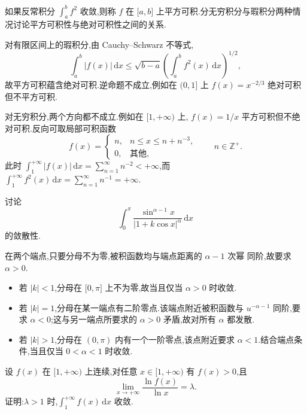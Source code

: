 \begin{example}
  如果反常积分 $\displaystyle\int_a^bf^2$ 收敛,则称 $f$ 在 $\lbrack a,b\rbrack$ 上平方可积.分无穷积分与瑕积分两种情况讨论平方可积性与绝对可积性之间的关系.
\end{example}
\exampleblank

\begin{solution}
  对有限区间上的瑕积分,由 Cauchy--Schwarz 不等式,
  \[
    \displaystyle\int_a^b|f(x)|\,\mathrm{d}x
    \leq\sqrt{b-a}\left(\int_a^bf^2(x)\,\mathrm{d}x\right)^{1/2},
  \]
  故平方可积蕴含绝对可积.逆命题不成立,例如在 $(0,1\rbrack$ 上
  $f(x)=x^{-2/3}$ 绝对可积但不平方可积.

  对无穷积分,两个方向都不成立.例如在 $\lbrack1,+\infty)$ 上,
  $f(x)=1/x$ 平方可积但不绝对可积.反向可取局部可积函数
  \[
    f(x)=
    \begin{cases}
      n, & n\leq x\leq n+n^{-3}, \\
      0, & \text{其他},
    \end{cases}
    \qquad n\in\mathbb{Z}^+.
  \]
  此时 $\displaystyle\int_1^{+\infty}|f(x)|\,\mathrm{d}x
    =\sum\limits_{n=1}^{\infty}n^{-2}<+\infty$,而
  $\displaystyle\int_1^{+\infty}f^2(x)\,\mathrm{d}x
    =\sum\limits_{n=1}^{\infty}n^{-1}=+\infty$.
\end{solution}

\begin{example}
  讨论
  \[
    \displaystyle\int_0^\pi\dfrac{\sin^{\alpha-1}x}{|1+k\cos x|^\alpha}\,\mathrm{d}x
  \]
  的敛散性.
\end{example}
\exampleblank

\begin{solution}
  在两个端点,只要分母不为零,被积函数均与端点距离的 $\alpha-1$ 次幂
  同阶,故要求 $\alpha>0$.
  \begin{itemize}
    \item 若 $|k|<1$,分母在 $\lbrack0,\pi\rbrack$ 上不为零,故当且仅当
          $\alpha>0$ 时收敛.
    \item 若 $|k|=1$,分母在某一端点有二阶零点.该端点附近被积函数与
          $u^{-\alpha-1}$ 同阶,要求 $\alpha<0$;这与另一端点所要求的
          $\alpha>0$ 矛盾,故对所有 $\alpha$ 都发散.
    \item 若 $|k|>1$,分母在 $(0,\pi)$ 内有一个一阶零点,该点附近要求
          $\alpha<1$.结合端点条件,当且仅当 $0<\alpha<1$ 时收敛.
  \end{itemize}
\end{solution}

\begin{example}
  设 $f(x)$ 在 $\lbrack 1,+\infty)$ 上连续,对任意 $x\in\lbrack 1,+\infty)$ 有 $f(x)>0$,且
  \[
    \displaystyle\lim\limits_{x\to+\infty}\dfrac{\ln f(x)}{\ln x}=\lambda.
  \]
  证明:$\lambda>1$ 时,$\displaystyle\int_1^{+\infty}f(x)\,\mathrm{d}x$ 收敛.
\end{example}
\exampleblank

